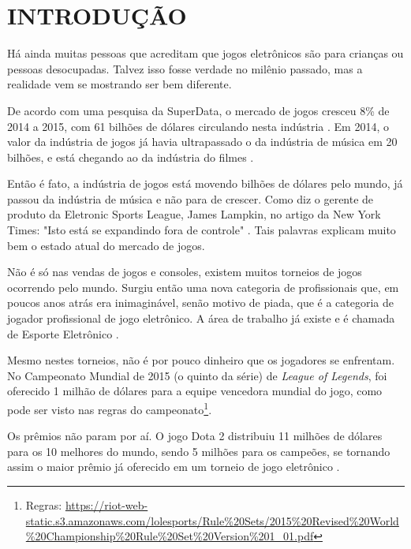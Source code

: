 \documentclass[
	12pt,					%
	openright,				%
	oneside,				%
	a4paper,				%
	bibjustif,				%
	chapter=TITLE,			%
	english,				%
	brazil,					%
	]{abntex2}
\begin{document}
\newpage %
\thispagestyle{empty} %
\tableofcontents*
\cleardoublepage

\textual
\newpage %
\chapter{INTRODUÇÃO}
	Há ainda muitas pessoas que acreditam que jogos eletrônicos são para crianças ou pessoas desocupadas.
	Talvez isso fosse verdade no milênio passado, mas a realidade vem se mostrando ser bem diferente.
	
	De acordo com uma pesquisa da SuperData,
	o mercado de jogos cresceu 8\% de 2014 a 2015,
	com 61 bilhões de dólares circulando nesta indústria \cite{cnbc}.
	Em 2014, o valor da indústria de jogos já havia ultrapassado o da indústria de música em 20 bilhões,
	e está chegando ao da indústria do filmes \cite{nytimes}.
	
	Então é fato, a indústria de jogos está movendo bilhões de dólares pelo mundo,
	já passou da indústria de música e não para de crescer.
	Como diz o gerente de produto da Eletronic Sports League, James Lampkin,
	no artigo da New York Times:
	"Isto está se expandindo fora de controle"{}
	\cite[tradução nossa]{nytimes}.
	Tais palavras explicam muito bem o estado atual do mercado de jogos.
	
	Não é só nas vendas de jogos e consoles,
	existem muitos torneios de jogos ocorrendo pelo mundo.
	Surgiu então uma nova categoria de profissionais que,
	em poucos anos atrás era inimaginável, senão motivo de piada,
	que é a categoria de jogador profissional de jogo eletrônico.
	A área de trabalho já existe e é chamada de Esporte Eletrônico \cite{nytimes}.
	
	Mesmo nestes torneios, não é por pouco dinheiro que os jogadores se enfrentam.
	No Campeonato Mundial de 2015 (o quinto da série) de \textit{League of Legends},
	foi oferecido 1 milhão de dólares para a equipe vencedora mundial do jogo,
	como pode ser visto nas regras do campeonato\footnote{Regras: \url{https://riot-web-static.s3.amazonaws.com/lolesports/Rule\%20Sets/2015\%20Revised\%20World\%20Championship\%20Rule\%20Set\%20Version\%201\_01.pdf}}.
	
	Os prêmios não param por aí.
	O jogo Dota 2 distribuiu 11 milhões de dólares para os 10 melhores do mundo,
	sendo 5 milhões para os campeões,
	se tornando assim o maior prêmio já oferecido em um torneio de jogo eletrônico \cite{nytimes}.
	
\end{document}
